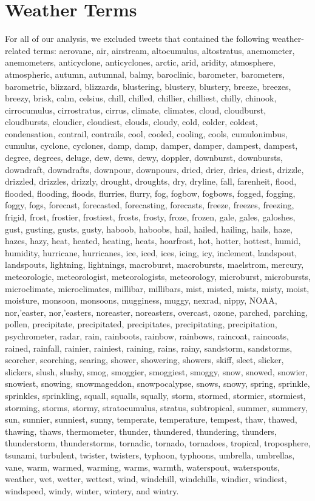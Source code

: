 \documentclass{article}
\begin{document}
\section{Weather Terms}
For all of our analysis, we excluded tweets that contained the following weather-related terms: aerovane, air, airstream, altocumulus, altostratus, anemometer, anemometers, anticyclone, anticyclones, arctic, arid, aridity, atmosphere, atmospheric, autumn, autumnal, balmy, baroclinic, barometer, barometers, barometric, blizzard, blizzards, blustering, blustery, blustery, breeze, breezes, breezy, brisk, calm, celsius, chill, chilled, chillier, chilliest, chilly, chinook, cirrocumulus, cirrostratus, cirrus, climate, climates, cloud, cloudburst, cloudbursts, cloudier, cloudiest, clouds, cloudy, cold, colder, coldest, condensation, contrail, contrails, cool, cooled, cooling, cools, cumulonimbus, cumulus, cyclone, cyclones, damp, damp, damper, damper, dampest, dampest, degree, degrees, deluge, dew, dews, dewy, doppler, downburst, downbursts, downdraft, downdrafts, downpour, downpours, dried, drier, dries, driest, drizzle, drizzled, drizzles, drizzly, drought, droughts, dry, dryline, fall, farenheit, flood, flooded, flooding, floods, flurries, flurry, fog, fogbow, fogbows, fogged, fogging, foggy, fogs, forecast, forecasted, forecasting, forecasts, freeze, freezes, freezing, frigid, frost, frostier, frostiest, frosts, frosty, froze, frozen, gale, gales, galoshes, gust, gusting, gusts, gusty, haboob, haboobs, hail, hailed, hailing, hails, haze, hazes, hazy, heat, heated, heating, heats, hoarfrost, hot, hotter, hottest, humid, humidity, hurricane, hurricanes, ice, iced, ices, icing, icy, inclement, landspout, landspouts, lightning, lightnings, macroburst, macrobursts, maelstrom, mercury, meteorologic, meteorologist, meteorologists, meteorology, microburst, microbursts, microclimate, microclimates, millibar, millibars, mist, misted, mists, misty, moist, moisture, monsoon, monsoons, mugginess, muggy, nexrad, nippy, NOAA, nor,’easter, nor,’easters, noreaster, noreasters, overcast, ozone, parched, parching, pollen, precipitate, precipitated, precipitates, precipitating, precipitation, psychrometer, radar, rain, rainboots, rainbow, rainbows, raincoat, raincoats, rained, rainfall, rainier, rainiest, raining, rains, rainy, sandstorm, sandstorms, scorcher, scorching, searing, shower, showering, showers, skiff, sleet, slicker, slickers, slush, slushy, smog, smoggier, smoggiest, smoggy, snow, snowed, snowier, snowiest, snowing, snowmageddon, snowpocalypse, snows, snowy, spring, sprinkle, sprinkles, sprinkling, squall, squalls, squally, storm, stormed, stormier, stormiest, storming, storms, stormy, stratocumulus, stratus, subtropical, summer, summery, sun, sunnier, sunniest, sunny, temperate, temperature, tempest, thaw, thawed, thawing, thaws, thermometer, thunder, thundered, thundering, thunders, thunderstorm, thunderstorms, tornadic, tornado, tornadoes, tropical, troposphere, tsunami, turbulent, twister, twisters, typhoon, typhoons, umbrella, umbrellas, vane, warm, warmed, warming, warms, warmth, waterspout, waterspouts, weather, wet, wetter, wettest, wind, windchill, windchills, windier, windiest, windspeed, windy, winter, wintery, and wintry.


\printbibliography
\end{document}

